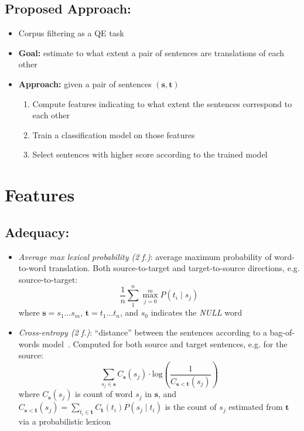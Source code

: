 \documentclass[a0]{sciposter}
\begin{document}
\begin{multicols*}{2}
\subsection*{Proposed Approach:}
\begin{itemize}
  \item Corpus filtering as a QE task
  \item {\bf Goal:} estimate to what extent a pair of sentences are translations of each other
  \item {\bf Approach:} given a pair of sentences $(\mathbf{s}, \mathbf{t})$
  \begin{enumerate}
    \item Compute features indicating to what extent the sentences correspond to each other
    \item Train a classification model on those features
    \item Select sentences with higher score according to the trained model
  \end{enumerate}
\end{itemize}


\section*{\Large Features}
\subsection*{Adequacy:} 
\begin{itemize}
  \item \textit{Average max lexical probability (2 f.)}: average maximum probability of word-to-word translation. Both source-to-target and target-to-source directions, e.g. source-to-target:
  $$ \frac{1}{n}\sum_1^n\max_{j=0}^m P(t_i\mid s_j) $$
  where $\mathbf{s}=s_1\ldots s_m$, $\mathbf{t}=t_1\ldots t_n$, and $s_0$ indicates the \textit{NULL} word
  \item \textit{Cross-entropy (2 f.)}: ``distance'' between the sentences according to a bag-of-words model~\cite{Hainan17}. Computed for both source and target sentences, e.g. for the source:
  $$\sum_{s_j\in\mathbf{s}}C_{\mathbf{s}}(s_j)\cdot\mathrm{log}\left(\frac{1}{C_{\mathbf{s}<\mathbf{t}}(s_j)}\right)$$
  where $C_{\mathbf{s}}(s_j)$ is count of word $s_j$ in $\mathbf{s}$, and $C_{\mathbf{s}<\mathbf{t}}(s_j)=\sum_{t_i\in\mathbf{t}}C_{\mathbf{t}}(t_i)P(s_j\mid t_i)$ is the count of $s_j$ estimated from $\mathbf{t}$ via a probabilistic lexicon 
\end{itemize}


\end{multicols*}
\end{document}
